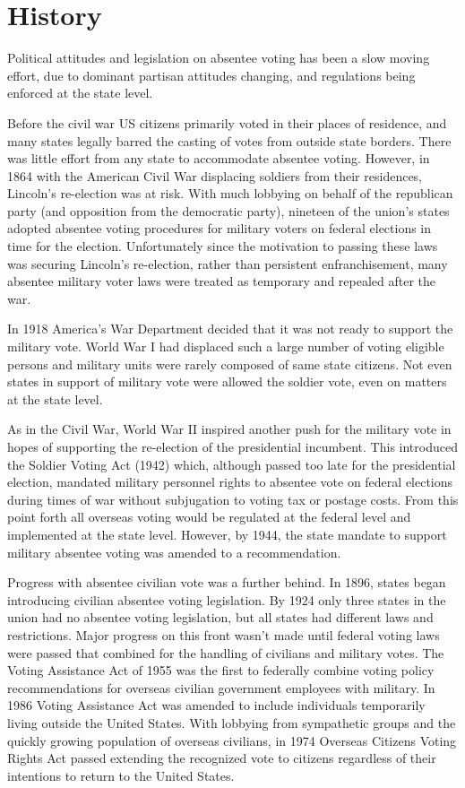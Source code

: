 \section{History}
Political attitudes and legislation on absentee voting has been a slow moving 
effort, due to dominant partisan attitudes changing, and regulations being 
enforced at the state level.

Before the civil war US citizens primarily voted in their places of residence, and many states legally barred the casting of votes from outside state borders. There was little effort from any state to accommodate absentee voting. However, in 1864 with the American Civil War displacing soldiers from their residences, Lincoln's re-election was at risk. With much lobbying on behalf of the republican party (and opposition from the democratic party), nineteen of the union's states adopted absentee voting procedures for military voters on federal elections in time for the election. Unfortunately since the motivation to passing these laws was securing Lincoln's re-election, rather than persistent enfranchisement, many absentee military voter laws were treated as temporary and repealed after the war.

In 1918 America's War Department decided that it was not ready to support the military vote. World War I had displaced such a large number of voting eligible persons and military units were rarely composed of same state citizens. Not even states in support of military vote were allowed the soldier vote, even on matters at the state level.

As in the Civil War, World War II inspired another push for the military vote in hopes of supporting the re-election of the presidential incumbent. This introduced the Soldier Voting Act (1942) which, although passed too late for the presidential election, mandated military personnel rights to absentee vote on federal elections during times of war without subjugation to voting tax or postage costs. From this point forth all overseas voting would be regulated at the federal level and implemented at the state level. However, by 1944, the state mandate to support military absentee voting was amended to a recommendation.

Progress with absentee civilian vote was a further behind. In 1896, states began introducing civilian absentee voting legislation. By 1924 only three states in the union had no absentee voting legislation, but all states had different laws and restrictions. Major progress on this front wasn't made until federal voting laws were passed that combined for the handling of civilians and military votes. The Voting Assistance Act of 1955 was the first to federally combine voting policy recommendations for overseas civilian government employees with military. In 1986 Voting Assistance Act was amended to include individuals temporarily living outside the United States. With lobbying from sympathetic groups and the quickly growing population of overseas civilians, in 1974 Overseas Citizens Voting Rights Act passed extending the recognized vote to citizens regardless of their intentions to return to the United States.

